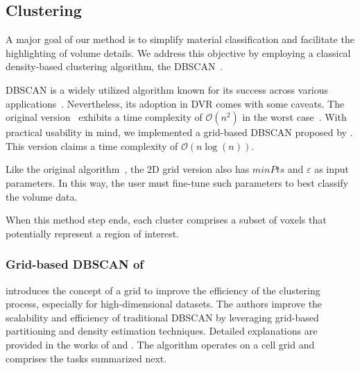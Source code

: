 \subsection{Clustering}
\label{subsect:clustering}
A major goal of our method is to simplify material classification and facilitate the highlighting of volume details. We address this objective by employing a classical density-based clustering algorithm, the DBSCAN~\cite{ester1996}. 

DBSCAN is a widely utilized algorithm known for its success across various applications~\cite{schubert2017}. Nevertheless, its adoption in DVR comes with some caveats.  The original version~\cite{ester1996} exhibits a time complexity of $\mathcal{O} (n^2)$ in the worst case~\cite{schubert2017}. With practical usability in mind, we implemented a grid-based  DBSCAN proposed by \cite{gunawan2013}. This version claims a time complexity of $\mathcal{O} (n \log (n))$. 

Like the original algorithm~\cite{ester1996}, the 2D grid version also has $minPts$ and $\varepsilon$ as input parameters. In this way, the user must fine-tune such parameters to best classify the volume data. 

When this method step ends, each cluster comprises a subset of voxels that potentially represent a region of interest.

\subsubsection{Grid-based DBSCAN of \cite{gunawan2013}} 

\cite{gunawan2013} introduces the concept of a grid to improve the efficiency of the clustering process, especially for high-dimensional datasets. The authors improve the scalability and efficiency of traditional DBSCAN by leveraging grid-based partitioning and density estimation techniques. Detailed explanations are provided in the works of \cite{gunawan2013} and \cite{gan2015}. The algorithm operates on a cell grid and comprises the tasks summarized next.

